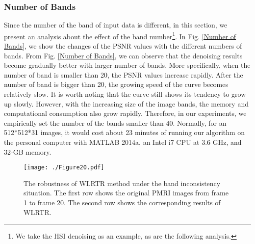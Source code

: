 \documentclass[twocolumn]{svjour3}          %
\begin{document}
  \subsubsection{\textbf{Number of Bands}}
    Since the number of the band of input data is different, in this section, we present an analysis about the effect of the band number\footnote{We take the HSI denoising as an example, as are the following analysis.}. In Fig. \ref{Number of Bands}, we show the changes of the PSNR values with the different numbers of bands. From Fig. \ref{Number of Bands}, we can observe that the denoising results become gradually better with larger number of bands. More specifically, when the number of band is smaller than 20, the PSNR values increase rapidly. After the number of band is bigger than 20, the growing speed of the curve becomes relatively slow. It is worth noting that the curve still shows its tendency to grow up slowly. However, with the increasing size of the image bands, the memory and computational consumption also grow rapidly. Therefore, in our experiments, we empirically set the number of the bands smaller than 40. Normally, for an 512*512*31 images, it would cost about 23 minutes of running our algorithm on the personal computer with MATLAB 2014a, an Intel i7 CPU at 3.6 GHz, and 32-GB memory.

\begin{figure}
\begin{center}
    \texttt{[image: ./Figure20.pdf]}
\end{center}
   \caption{The robustness of WLRTR method under the band inconsistency situation. The first row shows the original PMRI images from frame 1 to frame 20. The second row shows the corresponding results of WLRTR.}
\label{Robustness of the band consistency}
\end{figure}


\end{document}
